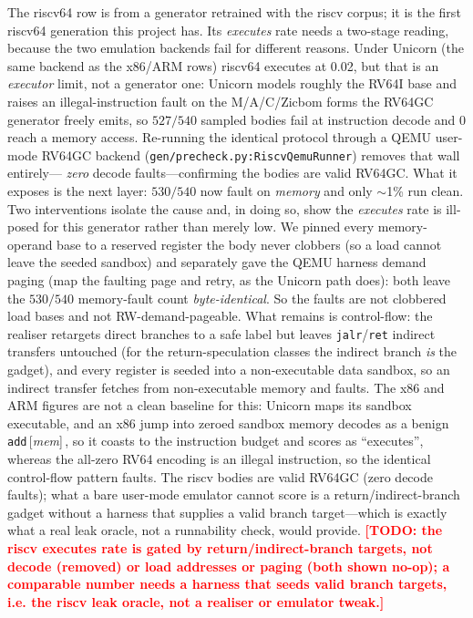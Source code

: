 \documentclass[conference]{IEEEtran}
\newcommand{\todo}[1]{\textcolor{red}{\textbf{[TODO: #1]}}}
\begin{document}
The riscv64 row is from a generator retrained with the riscv corpus; it is
the first riscv64 generation this project has. Its \emph{executes} rate needs a
two-stage reading, because the two emulation backends fail for different
reasons. Under Unicorn (the same backend as the x86/ARM rows) riscv64 executes
at 0.02, but that is an \emph{executor} limit, not a generator one: Unicorn
models roughly the RV64I base and raises an illegal-instruction fault on the
M/A/C/Zicbom forms the RV64GC generator freely emits, so $527/540$ sampled
bodies fail at instruction decode and $0$ reach a memory access. Re-running the
identical protocol through a QEMU user-mode RV64GC backend
(\texttt{gen/precheck.py:RiscvQemuRunner}) removes that wall entirely---
\emph{zero} decode faults---confirming the bodies are valid RV64GC. What it
exposes is the next layer: $530/540$ now fault on \emph{memory} and only $\sim$1\%
run clean. Two interventions isolate the cause and, in doing so, show the
\emph{executes} rate is ill-posed for this generator rather than merely low. We
pinned every memory-operand base to a reserved register the body never clobbers
(so a load cannot leave the seeded sandbox) and separately gave the QEMU harness
demand paging (map the faulting page and retry, as the Unicorn path does): both
leave the $530/540$ memory-fault count \emph{byte-identical}. So the faults are
not clobbered load bases and not RW-demand-pageable. What remains is
control-flow: the realiser retargets direct branches to a safe label but leaves
\texttt{jalr}/\texttt{ret} indirect transfers untouched (for the
return-speculation classes the indirect branch \emph{is} the gadget), and every
register is seeded into a non-executable data sandbox, so an indirect transfer
fetches from non-executable memory and faults. The x86 and ARM figures are not a
clean baseline for this: Unicorn maps its sandbox executable, and an x86 jump
into zeroed sandbox memory decodes as a benign \texttt{add}\,[\emph{mem}]\,, so
it coasts to the instruction budget and scores as ``executes'', whereas the
all-zero RV64 encoding is an illegal instruction, so the identical control-flow
pattern faults. The riscv bodies are valid RV64GC (zero decode faults); what a
bare user-mode emulator cannot score is a return/indirect-branch gadget without
a harness that supplies a valid branch target---which is exactly what a real
leak oracle, not a runnability check, would provide.
\todo{the riscv executes rate is gated by return/indirect-branch targets, not
decode (removed) or load addresses or paging (both shown no-op); a comparable
number needs a harness that seeds valid branch targets, i.e. the riscv leak
oracle, not a realiser or emulator tweak.}
\end{document}
